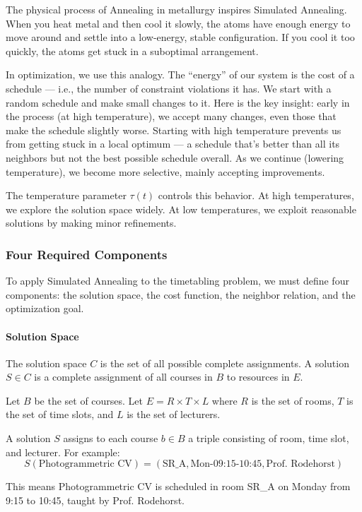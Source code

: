 \documentclass[11pt,a4paper]{article}
\begin{document}
The physical process of Annealing in metallurgy inspires Simulated Annealing. When you heat metal and then cool it slowly, the atoms have enough energy to move around and settle into a low-energy, stable configuration. If you cool it too quickly, the atoms get stuck in a suboptimal arrangement.

In optimization, we use this analogy. The ``energy'' of our system is the cost of a schedule — i.e., the number of constraint violations it has. We start with a random schedule and make small changes to it. Here is the key insight: early in the process (at high temperature), we accept many changes, even those that make the schedule slightly worse. Starting with high temperature prevents us from getting stuck in a local optimum — a schedule that's better than all its neighbors but not the best possible schedule overall. As we continue (lowering temperature), we become more selective, mainly accepting improvements.

The temperature parameter $\tau(t)$ controls this behavior. At high temperatures, we explore the solution space widely. At low temperatures, we exploit reasonable solutions by making minor refinements.

\subsubsection{Four Required Components}

To apply Simulated Annealing to the timetabling problem, we must define four components: the solution space, the cost function, the neighbor relation, and the optimization goal.

\paragraph{Solution Space}

The solution space $C$ is the set of all possible complete assignments. A solution $S \in C$ is a complete assignment of all courses in $B$ to resources in $E$.

Let $B$ be the set of courses. Let $E = R \times T \times L$ where $R$ is the set of rooms, $T$ is the set of time slots, and $L$ is the set of lecturers.

A solution $S$ assigns to each course $b \in B$ a triple consisting of room, time slot, and lecturer. For example:
$$S(\text{Photogrammetric CV}) = (\text{SR\_A}, \text{Mon-09:15-10:45}, \text{Prof. Rodehorst})$$

This means Photogrammetric CV is scheduled in room SR\_A on Monday from 9:15 to 10:45, taught by Prof. Rodehorst.
\end{document}
